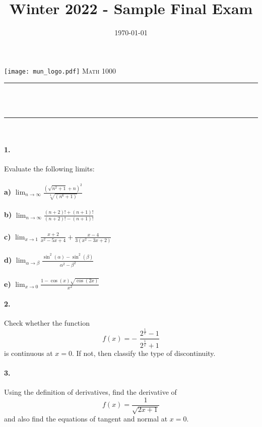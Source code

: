 \documentclass[12pt,oneside,oldfontcommands]{memoir}
\title{Winter 2022 - Sample Final Exam}
\date{\today}
\makeatletter
\def\maketitle{%
  \null
  \thispagestyle{empty}
  \begin{center}\leavevmode
       \normalfont
       \texttt{[image: mun\_logo.pdf]}
       \vskip 0.5cm   
       \textsc{\Large Math 1000}\\[0.5 cm]
	     {\large \@date\par}
       \vskip 1.0cm
	\rule{\linewidth}{0.2 mm} \\[0.4 cm]
	{ \huge \bfseries \@title}\\
	\rule{\linewidth}{0.2 mm} \\[1.5 cm]
   \end{center}
   \vfill
   \null
   \cleardoublepage
  }
\makeatother
\begin{document}
\maketitle
\frontmatter
\let\cleardoublepage\clearpage
\mainmatter
\sloppy

	\paragraph{1.}
	Evaluate the following limits:
	\\
	\\
	\textbf{a)} $ \displaystyle \lim_{n \to \infty} \frac{(\sqrt{n^2+1}+n)^2}{\sqrt[3]{(n^6+1)}}$\\
	\\
	\textbf{b)} $ \displaystyle \lim_{n \to \infty} \frac{(n+2)! + (n+1)!}{(n+2)! - (n+1)!}$\\
	\\
	\textbf{c)} $ \displaystyle \lim_{x \to 1} \frac{x+2}{x^2-5x+4} + \frac{x-4}{3(x^2-3x+2)}$\\
	\\
	\textbf{d)} $ \displaystyle \lim_{\alpha \to \beta} \frac{\sin^2(\alpha)-\sin^2(\beta)}{\alpha^2 - \beta^2}$\\
	\\
	\textbf{e)} $ \displaystyle \lim_{x \to 0} \frac{1-\cos(x)\sqrt{\cos(2x)}}{x^2}$\\
	
	\paragraph{2.}
	Check whether the function
	\textit{
	$$f(x) = - \hspace{4pt}\frac{2^\frac{1}{x}-1}{2^\frac{1}{x}+1}$$
	}
	\hspace{12pt} is continuous at $x=0$. If not, then classify the type of discontinuity.
	
	\paragraph{3.}
	Using the definition of derivatives, find the derivative of
	$$f(x) =  \frac{1}{\sqrt{2x+1}} $$
	\hspace{16pt} and also find the equations of tangent and normal at $x=0$.
	
\end{document}
